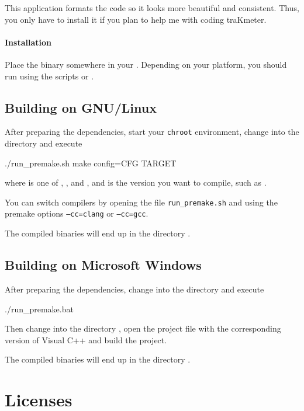 This application formats the code so it looks more beautiful and
consistent.  Thus, you only have to install it if you plan to help me
with coding traKmeter.

\subsubsection{Installation}

Place the binary somewhere in your .  Depending on your
platform, you should run  using the scripts
 or .

\section{Building on GNU/Linux}

After preparing the dependencies, start your \texttt{chroot}
environment, change into the directory  and execute

\begin{VerbatimBoth}
  ./run_premake.sh
  make config=CFG TARGET
\end{VerbatimBoth}

where  is one of ,
,  and
, and  is the version
you want to compile, such as .

You can switch compilers by opening the file \texttt{run\_premake.sh}
and using the premake options \texttt{--cc=clang} or
\texttt{--cc=gcc}.

The compiled binaries will end up in the directory .

\section{Building on Microsoft Windows}

After preparing the dependencies, change into the directory
 and execute

\begin{VerbatimBoth}
  ./run_premake.bat
\end{VerbatimBoth}

Then change into the directory , open the
project file with the corresponding version of Visual C++ and build
the project.

The compiled binaries will end up in the directory .

\chapter{Licenses}

\scriptsize

\normalsize

\scriptsize

\normalsize




